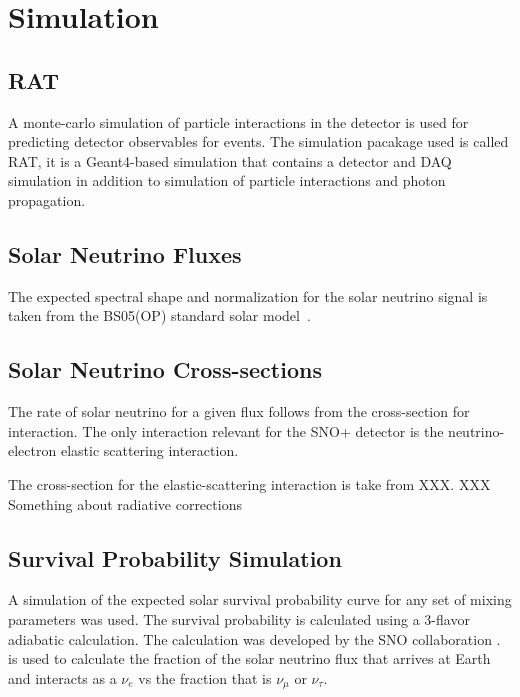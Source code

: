 \section{Simulation}
\subsection{RAT}
A monte-carlo simulation of particle interactions in the detector is used
for predicting detector observables for events.
The simulation pacakage used is called RAT, it is a Geant4-based simulation that
contains a detector and DAQ simulation in addition to simulation of particle
interactions and photon propagation.

\subsection{Solar Neutrino Fluxes}
The expected spectral shape and normalization for the solar neutrino signal is
taken from the BS05(OP) standard solar model~\cite{XXX}.

\subsection{Solar Neutrino Cross-sections}
The rate of solar neutrino for a given flux follows from the cross-section for
interaction. The only interaction relevant for the SNO+ detector is the
neutrino-electron elastic scattering interaction.

The cross-section for the elastic-scattering interaction is take from
XXX.
XXX Something about radiative corrections

\subsection{Survival Probability Simulation}
A simulation of the expected solar survival probability curve for any set of mixing
parameters was used. The survival probability is calculated using a
3-flavor adiabatic calculation. The calculation was developed by the
SNO collaboration \cite{XXX}.
is used to calculate the fraction of the solar neutrino flux that arrives
at Earth and interacts as a $\nu_{e}$ vs the fraction that is $\nu_{\mu}$ or $\nu_{\tau}$.


